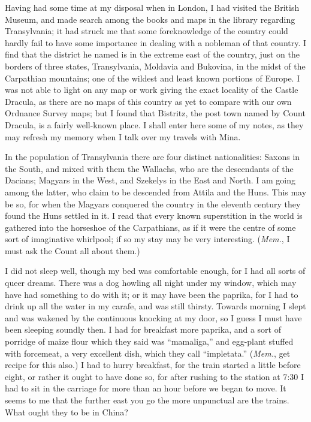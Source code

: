 \documentclass[12pt,openright]{book}
\begin{document}
Having had some time at my disposal when in London, I had visited the British Museum, and made search among the books and maps in the library regarding Transylvania; it had struck me that some foreknowledge of the country could hardly fail to have some importance in dealing with a nobleman of that country. I find that the district he named is in the extreme east of the country, just on the borders of three states, Transylvania, Moldavia and Bukovina, in the midst of the Carpathian mountains; one of the wildest and least known portions of Europe. I was not able to light on any map or work giving the exact locality of the Castle Dracula, as there are no maps of this country as yet to compare with our own Ordnance Survey maps; but I found that Bistritz, the post town named by Count Dracula, is a fairly well-known place. I shall enter here some of my notes, as they may refresh my memory when I talk over my travels with Mina.

In the population of Transylvania there are four distinct nationalities: Saxons in the South, and mixed with them the Wallachs, who are the descendants of the Dacians; Magyars in the West, and Szekelys in the East and North. I am going among the latter, who claim to be descended from Attila and the Huns. This may be so, for when the Magyars conquered the country in the eleventh century they found the Huns settled in it. I read that every known superstition in the world is gathered into the horseshoe of the Carpathians, as if it were the centre of some sort of imaginative whirlpool; if so my stay may be very interesting. (\textit{Mem.}, I must ask the Count all about them.)

I did not sleep well, though my bed was comfortable enough, for I had all sorts of queer dreams. There was a dog howling all night under my window, which may have had something to do with it; or it may have been the paprika, for I had to drink up all the water in my carafe, and was still thirsty. Towards morning I slept and was wakened by the continuous knocking at my door, so I guess I must have been sleeping soundly then. I had for breakfast more paprika, and a sort of porridge of maize flour which they said was “mamaliga,” and egg-plant stuffed with forcemeat, a very excellent dish, which they call “impletata.” (\textit{Mem.}, get recipe for this also.) I had to hurry breakfast, for the train started a little before eight, or rather it ought to have done so, for after rushing to the station at 7:30 I had to sit in the carriage for more than an hour before we began to move. It seems to me that the further east you go the more unpunctual are the trains. What ought they to be in China?
\end{document}
